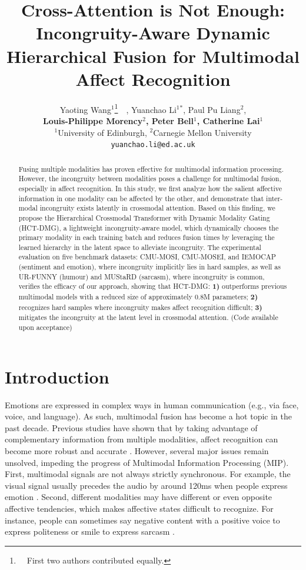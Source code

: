 \documentclass[11pt,a4paper]{article}
\title{Cross-Attention is Not Enough: Incongruity-Aware Dynamic Hierarchical Fusion for Multimodal Affect Recognition}
\author{Yaoting Wang$^1$\thanks{\ \ First two authors contributed equally.}\ \ , Yuanchao Li$^1$$^*$, Paul Pu Liang$^2$, \\ \textbf{Louis-Philippe Morency$^2$, Peter Bell$^1$, Catherine Lai$^1$} \\ $^1$University of Edinburgh, $^2$Carnegie Mellon University \\ \texttt{yuanchao.li@ed.ac.uk}}
\date{}
\begin{document}
\maketitle
\begin{abstract}
Fusing multiple modalities has proven effective for multimodal information processing. However, the incongruity between modalities poses a challenge for multimodal fusion, especially in affect recognition. In this study, we first analyze how the salient affective information in one modality can be affected by the other, and demonstrate that inter-modal incongruity exists latently in crossmodal attention. Based on this finding, we propose the Hierarchical Crossmodal Transformer with Dynamic Modality Gating (HCT-DMG), a lightweight incongruity-aware model, which dynamically chooses the primary modality in each training batch and reduces fusion times by leveraging the learned hierarchy in the latent space to alleviate incongruity. The experimental evaluation on five benchmark datasets: CMU-MOSI, CMU-MOSEI, and IEMOCAP (sentiment and emotion), where incongruity implicitly lies in hard samples, as well as UR-FUNNY (humour) and MUStaRD (sarcasm), where incongruity is common, verifies the efficacy of our approach, showing that HCT-DMG: \textbf{1)} outperforms previous multimodal models with a reduced size of approximately 0.8M parameters; \textbf{2)} recognizes hard samples where incongruity makes affect recognition difficult; \textbf{3)} mitigates the incongruity at the latent level in crossmodal attention. (Code available upon acceptance)
\end{abstract}


\section{Introduction}
Emotions are expressed in complex ways  in human communication (e.g., via face, voice, and language). As such, multimodal fusion has become a hot topic in the past decade. Previous studies have shown that by taking advantage of complementary information from multiple modalities, affect recognition can become more robust and accurate \citep{Xu2018,Li2022}. However, several major issues remain unsolved, impeding the progress of Multimodal Information Processing (MIP). First, multimodal signals are not always strictly synchronous. For example, the visual signal usually precedes the audio by around 120ms when people express emotion \citep{grant2001speech}. Second, different modalities may have different or even opposite affective tendencies, which makes affective states difficult to recognize. For instance, people can sometimes say negative content with a positive voice to express politeness \cite{laplante2003things} or smile to express sarcasm \cite{caucci2012social}.
\end{document}
